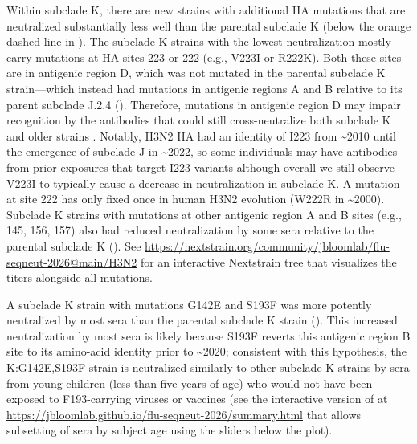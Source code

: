 Within subclade K, there are new strains with additional HA mutations that are neutralized substantially less well than the parental subclade K (below the orange dashed line in \textbf{}). The subclade K strains with the lowest neutralization mostly carry mutations at HA sites 223 or 222 (e.g., V223I or R222K). Both these sites are in antigenic region D, which was not mutated in the parental subclade K strain---which instead had mutations in antigenic regions A and B relative to its parent subclade J.2.4 (\textbf{}). Therefore, mutations in antigenic region D may impair recognition by the antibodies that could still cross-neutralize both subclade K and older strains \citep{liu2026a,kikawa2026a}. Notably, H3N2 HA had an identity of I223 from \textasciitilde2010 until the emergence of subclade J in \textasciitilde2022, so some individuals may have antibodies from prior exposures that target I223 variants although overall we still observe V223I to typically cause a decrease in neutralization in subclade K. A mutation at site 222 has only fixed once in human H3N2 evolution (W222R in \textasciitilde2000). Subclade K strains with mutations at other antigenic region A and B sites (e.g., 145, 156, 157) also had reduced neutralization by some sera relative to the parental subclade K (\textbf{}). See \href{https://nextstrain.org/community/jbloomlab/flu-seqneut-2026@main/H3N2}{https://nextstrain.org/community/jbloomlab/flu-seqneut-2026@main/H3N2} for an interactive Nextstrain tree that visualizes the titers alongside all mutations.

A subclade K strain with mutations G142E and S193F was more potently neutralized by most sera than the parental subclade K strain (\textbf{}). This increased neutralization by most sera is likely because S193F reverts this antigenic region B site to its amino-acid identity prior to \textasciitilde2020; consistent with this hypothesis, the K:G142E,S193F strain is neutralized similarly to other subclade K strains by sera from young children (less than five years of age) who would not have been exposed to F193-carrying viruses or vaccines (see the interactive version of \textbf{} at \href{https://jbloomlab.github.io/flu-seqneut-2026/summary.html}{https://jbloomlab.github.io/flu-seqneut-2026/summary.html} that allows subsetting of sera by subject age using the sliders below the plot).


